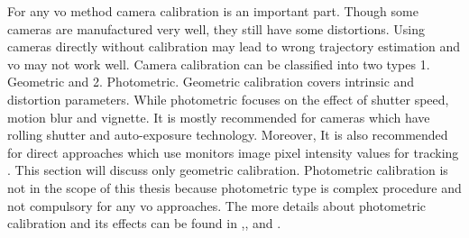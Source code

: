 For any \acrshort{vo} method camera calibration is an important part. Though some cameras are manufactured very well, they still have some distortions. Using cameras directly without calibration may lead to wrong trajectory estimation and \acrshort{vo} may not work well. Camera calibration can be classified into two types 1. Geometric and 2. Photometric. Geometric calibration covers intrinsic and distortion parameters. While photometric focuses on the effect of shutter speed, motion blur and vignette. It is mostly recommended for cameras which have rolling shutter and auto-exposure technology. Moreover, It is also recommended for direct approaches which use monitors image pixel intensity values for tracking \cite{yang2018challenges}. This section will discuss only geometric calibration. Photometric calibration is not in the scope of this thesis because photometric type is complex procedure and not compulsory for any \acrshort{vo} approaches. The more details about photometric calibration and its effects can be found in \cite{yang2018challenges} ,\cite{photometrically}, \cite{bergmann2017online} and \cite{vignette}.\\

